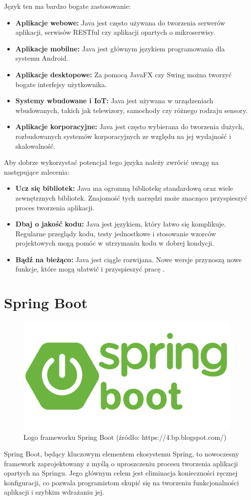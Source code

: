 Język ten ma bardzo bogate zastosowanie:
\begin{itemize}
\item \textbf{Aplikacje webowe:} Java jest często używana do tworzenia serwerów aplikacji, serwisów RESTful czy aplikacji opartych o mikroserwisy.
\item \textbf{Aplikacje mobilne:} Java jest głównym językiem programowania dla systemu Android.
\item \textbf{Aplikacje desktopowe:} Za pomocą JavaFX czy Swing można tworzyć bogate interfejsy użytkownika.
\item \textbf{Systemy wbudowane i IoT:} Java jest używana w urządzeniach wbudowanych, takich jak telewizory, samochody czy różnego rodzaju sensory.
\item \textbf{Aplikacje korporacyjne:} Java jest często wybierana do tworzenia dużych, rozbudowanych systemów korporacyjnych ze względu na jej wydajność i skalowalność.
\end{itemize}

Aby dobrze wykorzystać potencjał tego języka należy zwrócić uwagę na następujące zalecenia:
\begin{itemize}
\item \textbf{Ucz się bibliotek:} Java ma ogromną bibliotekę standardową oraz wiele zewnętrznych bibliotek. Znajomość tych narzędzi może znacząco przyspieszyć proces tworzenia aplikacji.
\item \textbf{Dbaj o jakość kodu:} Java jest językiem, który łatwo się komplikuje. Regularne przeglądy kodu, testy jednostkowe i stosowanie wzorców projektowych mogą pomóc w utrzymaniu kodu w dobrej kondycji.
\item \textbf{Bądź na bieżąco:} Java jest ciągle rozwijana. Nowe wersje przynoszą nowe funkcje, które mogą ułatwić i przyspieszyć pracę \cite{javaSpecification}.
\end{itemize}

\section{Spring Boot}
\begin{figure}[h]
    \centering
    \includegraphics[width=0.6\linewidth]{./img/springboot.png}
    \caption{Logo frameworku Spring Boot (źródło: https://4.bp.blogspot.com/)}
    \label{fig:Springboot}
\end{figure}
Spring Boot, będący kluczowym elementem ekosystemu Spring, to nowoczesny framework zaprojektowany z myślą o uproszczeniu procesu tworzenia aplikacji opartych na Springu. Jego głównym celem jest eliminacja konieczności ręcznej konfiguracji, co pozwala programistom skupić się na tworzeniu funkcjonalności aplikacji i szybkim wdrażaniu jej.

